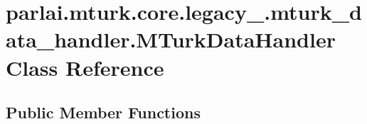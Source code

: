 \hypertarget{classparlai_1_1mturk_1_1core_1_1legacy__2018_1_1mturk__data__handler_1_1MTurkDataHandler}{}\section{parlai.\+mturk.\+core.\+legacy\+\_.\+mturk\+\_\+data\+\_\+handler.\+M\+Turk\+Data\+Handler Class Reference}
\label{classparlai_1_1mturk_1_1core_1_1legacy__2018_1_1mturk__data__handler_1_1MTurkDataHandler}
\subsection*{Public Member Functions}

